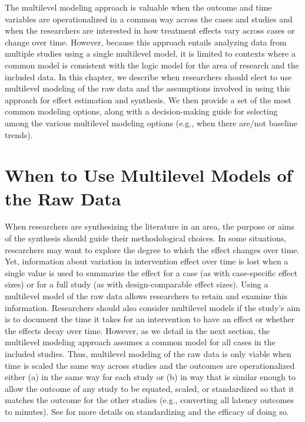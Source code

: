 \documentclass[
]{book}
\begin{document}
The multilevel modeling approach is valuable when the outcome and time variables are operationalized in a common way across the cases and studies and when the researchers are interested in how treatment effects vary across cases or change over time.
However, because this approach entails analyzing data from multiple studies using a single multilevel model, it is limited to contexts where a common model is consistent with the logic model for the area of research and the included data.
In this chapter, we describe when researchers should elect to use multilevel modeling of the raw data and the assumptions involved in using this approach for effect estimation and synthesis.
We then provide a set of the most common modeling options, along with a decision-making guide for selecting among the various multilevel modeling options (e.g., when there are/not baseline trends).

\hypertarget{when-to-use-multilevel-models-of-the-raw-data}{%
\section{When to Use Multilevel Models of the Raw Data}\label{when-to-use-multilevel-models-of-the-raw-data}}

When researchers are synthesizing the literature in an area, the purpose or aims of the synthesis should guide their methodological choices.
In some situations, researchers may want to explore the degree to which the effect changes over time.
Yet, information about variation in intervention effect over time is lost when a single value is used to summarize the effect for a case (as with case-specific effect sizes) or for a full study (as with design-comparable effect sizes).
Using a multilevel model of the raw data allows researchers to retain and examine this information.
Researchers should also consider multilevel models if the study's aim is to document the time it takes for an intervention to have an effect or whether the effects decay over time.
However, as we detail in the next section, the multilevel modeling approach assumes a common model for all cases in the included studies.
Thus, multilevel modeling of the raw data is only viable when time is scaled the same way across studies and the outcomes are operationalized either
(a) in the same way for each study or
(b) in way that is similar enough to allow the outcome of any study to be equated, scaled, or standardized so that it matches the outcome for the other studies (e.g., converting all latency outcomes to minutes).
See \citet{Moeyaert_Ugille_Ferron_Beretvas_VandenNoortgate_2013} for more details on standardizing and the efficacy of doing so.
\end{document}
